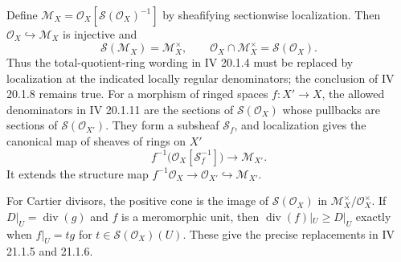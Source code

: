 \begin{proposition}\label{SA23-D-14}
Define
$\mathcal M_X=\mathcal O_X[\mathscr S(\mathcal O_X)^{-1}]$
by sheafifying sectionwise localization.  Then
$\mathcal O_X\hookrightarrow\mathcal M_X$ is injective and
\[
 \mathscr S(\mathcal M_X)=\mathcal M_X^\times,\qquad
 \mathcal O_X\cap\mathcal M_X^\times
 =\mathscr S(\mathcal O_X).
\]
Thus the total-quotient-ring wording in IV 20.1.4 must be
replaced by localization at the indicated locally regular
denominators; the conclusion of IV 20.1.8 remains true.
For a morphism of ringed spaces $f:X'\to X$, the allowed
denominators in IV 20.1.11 are the sections of
$\mathscr S(\mathcal O_X)$ whose pullbacks are sections of
$\mathscr S(\mathcal O_{X'})$.  They form a subsheaf
$\mathscr S_f$, and localization gives the canonical map of
sheaves of rings on $X'$
\[
 f^{-1}\bigl(\mathcal O_X[\mathscr S_f^{-1}]\bigr)
 \longrightarrow\mathcal M_{X'}.
\]
It extends the structure map
$f^{-1}\mathcal O_X\to\mathcal O_{X'}\hookrightarrow\mathcal M_{X'}$.

For Cartier divisors, the positive cone is the image of
$\mathscr S(\mathcal O_X)$ in
$\mathcal M_X^\times/\mathcal O_X^\times$.  If
$D|_U=\operatorname{div}(g)$ and $f$ is a meromorphic unit,
then $\operatorname{div}(f)|_U\geq D|_U$ exactly when
$f|_U=tg$ for
$t\in\mathscr S(\mathcal O_X)(U)$.
These give the precise replacements in IV 21.1.5 and 21.1.6.
\end{proposition}
